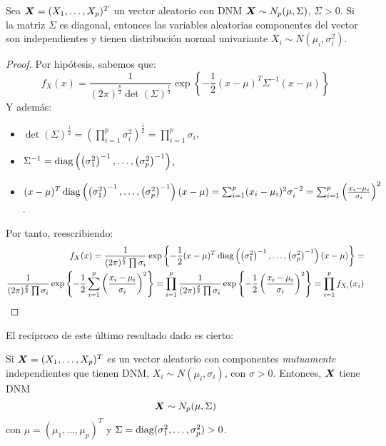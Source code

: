   \begin{nprop}
    Sea $\boldsymbol{X} = (X_1,\dots,X_p)^T$ un vector aleatorio con DNM $\boldsymbol{X} \sim N_p(\mu,\Sigma)$, $\Sigma > 0$. Si la matriz $\Sigma$ es diagonal,
    entonces las variables aleatorias componentes del vector son independientes y tienen distribución normal univariante $X_i \sim N\left(\mu_i, \sigma_i^2\right)$.
  \end{nprop}
  \begin{proof}
    Por hipótesis, sabemos que:
    \[
    f_X(x) = \frac{1}{(2\pi)^{\frac{p}{2}} \det(\Sigma)^{\frac{1}{2}}}\exp\left\{- \frac{1}{2}(x-\mu)^T \Sigma^{-1}(x-\mu)\right\}
    \]
    Y además:
    \begin{itemize}
    \item $\det(\Sigma)^{\frac{1}{2}} = \left(\prod_{i = 1}^p \sigma_i^2\right)^{\frac{1}{2}} = \prod_{i=1}^p \sigma_i$,
    \item $\Sigma^{-1} = \operatorname{diag}\left(\left(\sigma_1^2\right)^{-1}, \dots , \left(\sigma_p^2\right)^{-1}\right)$,
      \item $(x-\mu)^T \operatorname{diag}\left(\left(\sigma_1^2\right)^{-1}, \dots , \left(\sigma_p^2\right)^{-1}\right) (x-\mu) = \sum_{i=1}^p (x_i-\mu_i)^2 \sigma_i^{-2} = \sum_{i = 1}^p \left(\frac{x_i-\mu_i}{\sigma_i}\right)^2$.
    \end{itemize}
    Por tanto, reescribiendo:
    \[
      \begin{split}
        f_X(x) = \frac{1}{(2\pi)^{\frac{p}{2}} \prod \sigma_i} \exp \left\{ -\frac{1}{2}(x-\mu)^T \operatorname{diag}\left(\left(\sigma_1^2\right)^{-1}, \dots , \left(\sigma_p^2\right)^{-1}\right) (x-\mu)  \right\} =\\
        \frac{1}{(2\pi)^{\frac{p}{2}} \prod \sigma_i} \exp \left\{ -\frac{1}{2} \sum_{i = 1}^p \left(\frac{x_i-\mu_i}{\sigma_i}\right)^2  \right\} = \prod_{i = 1}^p  \frac{1}{(2\pi)^{\frac{p}{2}} \prod \sigma_i} \exp \left\{ -\frac{1}{2} \left(\frac{x_i-\mu_i}{\sigma_i}\right)^2  \right\} = \prod_{i = 1}^p f_{X_i}(x_i)
    \end{split}
    \]

  \end{proof}


  El recíproco de este último resultado dado es cierto:
  \begin{nprop}
    Si $\boldsymbol{X} = (X_1,\dots,X_p)^T$ es un vector aleatorio con componentes \emph{mutuamente} independientes que tienen DNM, $X_i \sim N(\mu_i, \sigma_i)$, con $\sigma > 0$. Entonces, $\boldsymbol{X}$ tiene DNM
    \[
    \boldsymbol{X} \sim N_p(\mu, \Sigma)
    \]
    con $\mu = (\mu_1,\dots,\mu_p)^T$ y $\Sigma = \operatorname{diag}(\sigma_1^2 , \dots , \sigma_p^2) > 0$.
  \end{nprop}

